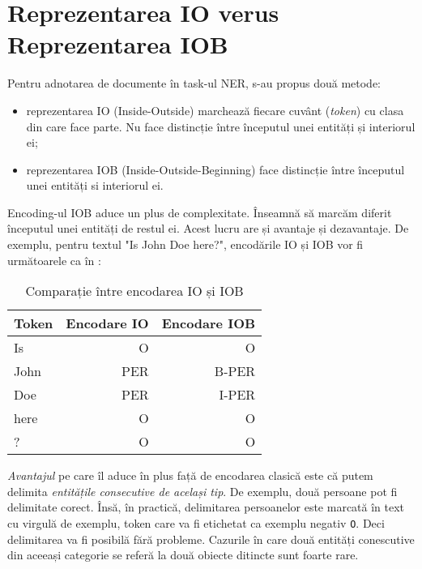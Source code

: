 

\section{Reprezentarea IO verus Reprezentarea IOB}
\label{sec:io-encoding}

Pentru adnotarea de documente în task-ul NER, s-au propus două metode:

\begin{itemize}
\item reprezentarea IO (Inside-Outside) marchează fiecare cuvânt (\textit{token}) cu clasa din care face parte. Nu face distincție între începutul unei entități și interiorul ei;
\item reprezentarea IOB (Inside-Outside-Beginning) face distincție între începutul unei entități si interiorul ei.
\end{itemize}

Encoding-ul IOB aduce un plus de complexitate. Înseamnă să marcăm diferit începutul unei entități de restul ei. Acest lucru are și avantaje și dezavantaje. De exemplu, pentru textul "Is John Doe here?", encodările IO și IOB vor fi următoarele ca în :


\begin{center}
\begin{table}[hb]
\caption{Comparație între encodarea IO și IOB}
\begin{tabular}{ |l | r | r |}
\hline
  Token & Encodare IO & Encodare IOB \\
\hline
  Is & O & O \\
  John & PER & B-PER  \\
  Doe & PER & I-PER \\
  here & O & O \\
  ? & O & O \\
  \hline
\end{tabular}
 \label{table:iob-encoding}
\end{table}
\end{center}


\textit{Avantajul} pe care îl aduce în plus față de encodarea clasică este că putem delimita  \textit{entitățile consecutive de același tip}. De exemplu, două persoane pot fi delimitate corect. Însă, în practică, delimitarea persoanelor este marcată în text cu virgulă de exemplu, token care va fi etichetat ca exemplu negativ \texttt{O}. Deci delimitarea va fi posibilă fără probleme. Cazurile în care două entități conescutive din aceeași categorie se referă la două obiecte ditincte sunt foarte rare.

